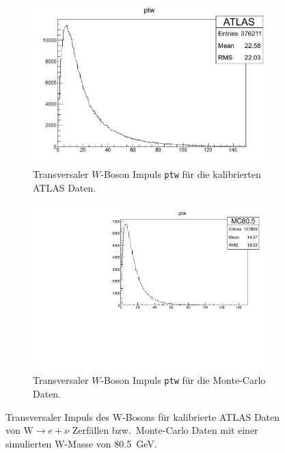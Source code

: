 \documentclass[11pt, a4paper]{article}
\numberwithin{equation}{section}
\begin{document}
\begin{figure}
	\centering
	\begin{subfigure}{.49\textwidth}
		\includegraphics[width=\textwidth]{./data/root/wmass/exercise1/ATLAS_ptw.pdf}
		\caption{Transversaler $W$-Boson Impuls \texttt{ptw} für die kalibrierten ATLAS Daten.}
	\end{subfigure}
	\begin{subfigure}{.49\textwidth}
		\includegraphics[width=\textwidth]{./data/root/wmass/exercise1/MC_ptw.pdf}
		\caption{Transversaler $W$-Boson Impuls \texttt{ptw} für die Monte-Carlo Daten.}
		\label{fig:mc_ptw}
	\end{subfigure}
	\caption{Transversaler Impuls des W-Bosons für kalibrierte ATLAS Daten von $\mathrm{W} \rightarrow e + \nu$ Zerfällen bzw.\  Monte-Carlo Daten mit einer simulierten W-Masse von \SI{80,5}{GeV}.}
	\label{fig:observablen_pt2}
\end{figure}
\end{document}
